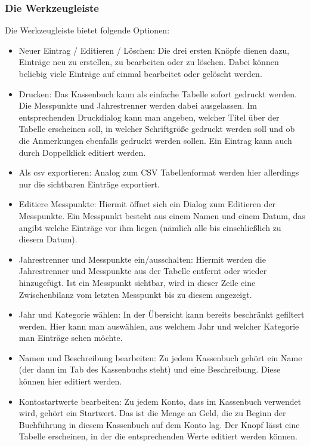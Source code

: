 \documentclass[a4paper,10pt,halfparskip,oneside,smallheadings]{scrbook}
\begin{document}
\subsubsection{Die Werkzeugleiste}
Die Werkzeugleiste bietet folgende Optionen:
\begin{itemize}
 \item Neuer Eintrag / Editieren / Löschen: Die drei ersten Knöpfe dienen dazu, Einträge neu zu erstellen, zu bearbeiten oder zu löschen. Dabei können beliebig viele Einträge auf einmal bearbeitet oder gelöscht werden.
 \item Drucken: Das Kassenbuch kann als einfache Tabelle sofort gedruckt werden. Die Messpunkte und Jahrestrenner werden dabei ausgelassen. Im entsprechenden Druckdialog kann man angeben, welcher Titel über der Tabelle erscheinen soll, in welcher Schriftgröße gedruckt werden soll und ob die Anmerkungen ebenfalls gedruckt werden sollen. Ein Eintrag kann auch durch Doppelklick editiert werden.
 \item Als csv exportieren: Analog zum CSV Tabellenformat werden hier allerdings nur die sichtbaren Einträge exportiert.
 \item Editiere Messpunkte: Hiermit öffnet sich ein Dialog zum Editieren der Messpunkte. Ein Messpunkt besteht aus einem Namen und einem Datum, das angibt welche Einträge vor ihm liegen (nämlich alle bis einschließlich zu diesem Datum).
 \item Jahrestrenner und Messpunkte ein/ausschalten: Hiermit werden die Jahrestrenner und Messpunkte aus der Tabelle entfernt oder wieder hinzugefügt. Ist ein Messpunkt sichtbar, wird in dieser Zeile eine Zwischenbilanz vom letzten Messpunkt bis zu diesem angezeigt.
 \item Jahr und Kategorie wählen: In der Übersicht kann bereits beschränkt gefiltert werden. Hier kann man auswählen, aus welchem Jahr und welcher Kategorie man Einträge sehen möchte.
 \item Namen und Beschreibung bearbeiten: Zu jedem Kassenbuch gehört ein Name (der dann im Tab des Kassenbuchs steht) und eine Beschreibung. Diese können hier editiert werden.  
 \item Kontostartwerte bearbeiten: Zu jedem Konto, dass im Kassenbuch verwendet wird, gehört ein Startwert. Das ist die Menge an Geld, die zu Beginn der Buchführung in diesem Kassenbuch auf dem Konto lag. Der Knopf lässt eine Tabelle erscheinen, in der die entsprechenden Werte editiert werden können.
\end{itemize}
\end{document}
